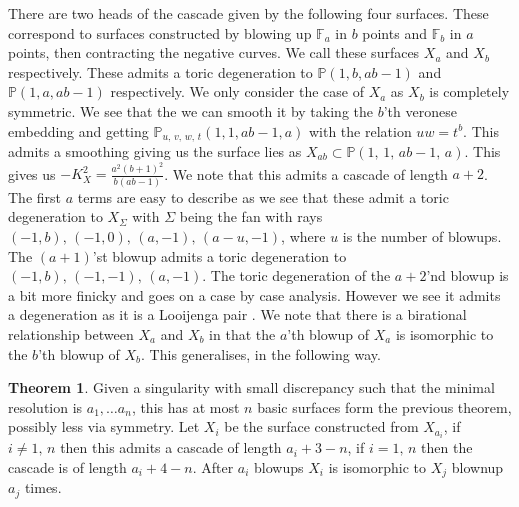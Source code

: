 \documentclass[11pt]{report}
\theoremstyle{definition}
\newtheorem{thm}{Theorem}[section]
\theoremstyle{definition}
\theoremstyle{definition}
\theoremstyle{definition}
\theoremstyle{definition}
\theoremstyle{definition}
\theoremstyle{definition}
\theoremstyle{definition}
\newcommand{\mb}[1]{\mathbb{#1}}
\newcommand{\LJ}{Looijenga pair }
\begin{document}
There are two heads of the cascade given by the following four surfaces. These correspond to surfaces constructed by blowing up $\mb{F}_a$ in $b$ points and $\mb{F}_b$ in $a$ points, then contracting the negative curves. We call these surfaces $X_a$ and $X_b$ respectively. These admits a toric degeneration to $\mb{P}(1, b, ab-1)$ and $\mb{P}(1, a, ab-1)$ respectively. We only consider the case of $X_a$ as $X_b$ is completely symmetric. We see that the we can smooth it by taking the $b$'th veronese embedding and  getting $\mb{P}_{u,\,v,\,w,\,t}(1, 1, ab-1, a)$ with the relation $uw = t^b$. This admits a smoothing giving us the surface lies as $X_{ab} \subset \mb{P}(1,\, 1, \, ab-1, \, a)$. This gives us $-K_X^2 = \frac{a^2(b+1)^2}{b(ab-1)}$. We note that this admits a cascade of length $a+2$. The first $a$ terms are easy to describe as we see that these admit a toric degeneration to $X_\Sigma$ with $\Sigma$ being the fan with rays $(-1, b), \, (-1, 0), \, (a, -1), \, (a-u, -1)$, where $u$ is the number of blowups. The $(a+1)$'st blowup admits a toric degeneration to $(-1, b), \, (-1, -1), \, (a, -1)$. The toric degeneration of the $a+2$'nd blowup is a bit more finicky and goes on a case by case analysis. However we see it admits a degeneration as it is a \LJ. We note that there is a birational relationship between $X_a$ and $X_b$ in that the $a$'th blowup of $X_a$ is isomorphic to the $b$'th blowup of $X_b$.  This generalises, in the following way. 
\begin{thm}
Given a singularity with small discrepancy such that the minimal resolution is $a_1, \dots a_n$, this has at most $n$ basic surfaces form the previous theorem, possibly less via symmetry. Let $X_i$ be the surface constructed from $X_{a_i}$, if $i \neq 1,\, n$ then this admits a cascade of length $a_i + 3 - n$, if $i = 1, \, n$ then the cascade is of length $a_i + 4 - n$.  After $a_i$ blowups $X_{i}$ is isomorphic to $X_j$ blownup $a_j$ times.
\end{thm}
\end{document}
